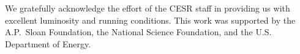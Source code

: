 We gratefully acknowledge the effort of the CESR staff 
in providing us with excellent luminosity and running conditions.
This work was supported by 
the A.P.~Sloan Foundation,
the National Science Foundation,
and the U.S. Department of Energy.
